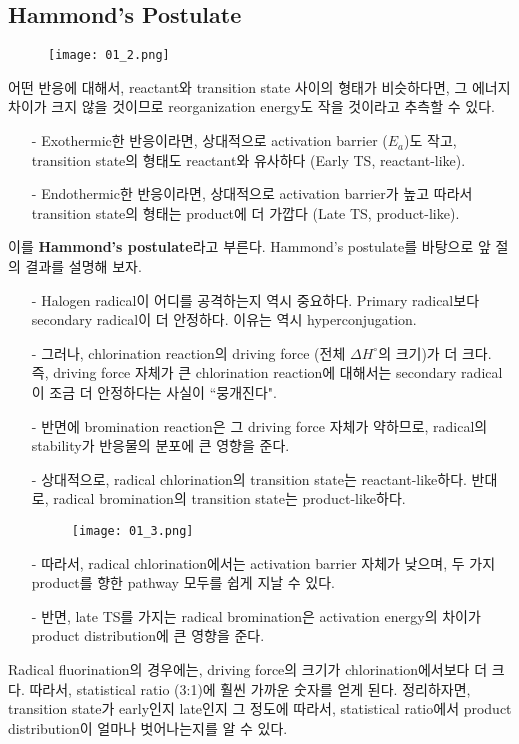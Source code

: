\documentclass[a4paper, 9pt]{article}
\begin{document}
\subsection{Hammond's Postulate}
\begin{figure*}[htbp]
\centering
\texttt{[image: 01\_2.png]}	
\end{figure*}
어떤 반응에 대해서, reactant와 transition state 사이의 형태가 비슷하다면, 그 에너지 차이가 크지 않을 것이므로 reorganization energy도 작을 것이라고 추측할 수 있다.
\begin{itemize}
	\item[-] Exothermic한 반응이라면, 상대적으로 activation barrier ($E_{a}$)도 작고, transition state의 형태도 reactant와 유사하다 (Early TS, reactant-like).
	\item[-] Endothermic한 반응이라면, 상대적으로 activation barrier가 높고 따라서 transition state의 형태는 product에 더 가깝다 (Late TS, product-like).
\end{itemize}
이를 \textbf{Hammond's postulate}라고 부른다. Hammond's postulate를 바탕으로 앞 절의 결과를 설명해 보자.
\begin{itemize}
	\item[-] Halogen radical이 어디를 공격하는지 역시 중요하다. Primary radical보다 secondary radical이 더 안정하다. 이유는 역시 hyperconjugation.
	\item[-] 그러나, chlorination reaction의 driving force (전체 $\Delta{H}^{\circ}$의 크기)가 더 크다. 즉, driving force 자체가 큰 chlorination reaction에 대해서는 secondary radical이 조금 더 안정하다는 사실이 ``뭉개진다".
	\item[-] 반면에 bromination reaction은 그 driving force 자체가 약하므로, radical의 stability가 반응물의 분포에 큰 영향을 준다.
	\item[-] 상대적으로, radical chlorination의 transition state는 reactant-like하다. 반대로, radical bromination의 transition state는 product-like하다.
	\begin{figure*}[htbp]
		\centering
		\texttt{[image: 01\_3.png]}	
	\end{figure*}
	\item[-] 따라서, radical chlorination에서는 activation barrier 자체가 낮으며, 두 가지 product를 향한 pathway 모두를 쉽게 지날 수 있다.
	\item[-] 반면, late TS를 가지는 radical bromination은 activation energy의 차이가 product distribution에 큰 영향을 준다.
\end{itemize}
Radical fluorination의 경우에는, driving force의 크기가 chlorination에서보다 더 크다. 따라서, statistical ratio (3:1)에 훨씬 가까운 숫자를 얻게 된다. 정리하자면, transition state가 early인지 late인지 그 정도에 따라서, statistical ratio에서 product distribution이 얼마나 벗어나는지를 알 수 있다.
\end{document}
